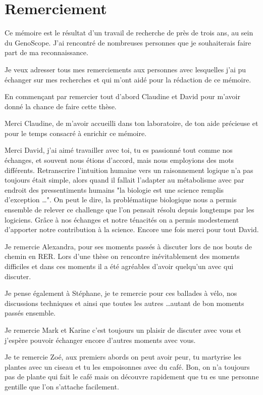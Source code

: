 \chapter*{Remerciement}
    \vspace{-4cm}
    \handwritingFont
    Ce mémoire est le résultat d’un travail de recherche de près de trois ans, au sein du GenoScope. J'ai rencontré de nombreuses personnes que je souhaiterais faire part de ma reconnaissance.
    
    Je veux adresser tous mes remerciements aux personnes avec lesquelles j’ai pu échanger sur mes recherches et qui m’ont aidé pour la rédaction de ce mémoire.
    
    En commençant par remercier tout d’abord Claudine et David pour m'avoir donné la chance de faire cette thèse.
    
    Merci Claudine, de m'avoir accueilli dans ton laboratoire, de ton aide précieuse et pour le temps consacré à enrichir ce mémoire.
    
    Merci David, j'ai aimé travailler avec toi, tu es passionné tout comme nos échanges, et souvent nous étions d'accord, mais nous employions des mots différents. Retranscrire l'intuition humaine vers un raisonnement logique n'a pas toujours était simple, alors quand il fallait l'adapter au métabolisme avec par endroit des pressentiments humains "la biologie est une science remplis d'exception \ldots". On peut le dire, la problématique biologique nous a permis ensemble de relever ce challenge que l'on pensait résolu depuis longtemps par les logiciens. Grâce à nos échanges et notre ténacités on a permis modestement d'apporter notre contribution à la science. Encore une fois merci pour tout David.
    
    Je remercie Alexandra, pour ses moments passés à discuter lors de nos bouts de chemin en RER. Lors d'une thèse on rencontre inévitablement des moments difficiles et dans ces moments il a été agréables d'avoir quelqu'un avec qui discuter.
    
    Je pense également à Stéphane, je te remercie pour ces ballades à vélo, nos discussions techniques et ainsi que toutes les autres \ldots autant de bon moments passés ensemble.
    
    Je remercie Mark et Karine c'est toujours un plaisir de discuter avec vous et j'espère pouvoir échanger encore d'autres moments avec vous.
    
    Je te remercie Zoé, aux premiers abords on peut avoir peur, tu martyrise les plantes avec un ciseau et tu les empoisonnes avec du café. Bon, on n'a toujours pas de plante qui fait le café mais on découvre rapidement que tu es une personne gentille que l'on s'attache facilement.
    
